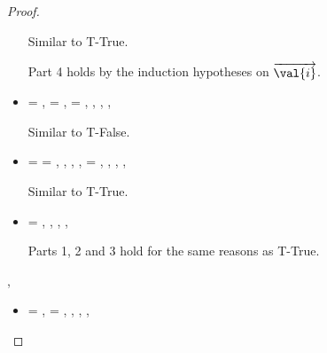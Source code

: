 \begin{lemma}
\begin{proof}
\begin{case}[B-Val]
\begin{itemize}
\begin{subcase}[T-Instance]
        Similar to T-True.

        Part 4 holds by the induction hypotheses on ${\overrightarrow{\val{i}}}$.
      \end{subcase}
  \item[] 
    \begin{subcase}[T-Nil] 
      \val{} = \nil{},
\ep{} = \nil, 
\e{} = \nil, 
\issubtypein{}{\Nil}{\ty{}},
\inpropenv{\botprop{}}{\thenprop{\prop{}}},
\inpropenv{\topprop{}}{\elseprop{\prop{}}},
\issubtypein{}{\emptyobject{}}{\object{}}

      Similar to T-False.
\end{subcase}
\item[]
\begin{subcase}[T-Multi] 
  \val{} = { {}}
  \ep{} = { {}},
  \judgementtworewrite {} {} {}{},
  ,
  ,
  \e{} = { {}},
  ,
  \inpropenv{\topprop{}}{\thenprop{\prop{}}},
  \inpropenv{\botprop{}}{\elseprop{\prop{}}},
  \issubtypein{}{\emptyobject{}}{\object{}}

        Similar to T-True.
\end{subcase}
\item[]
\begin{subcase}[T-Const]
  \e{} = {\const{}},
  \issubtypein{}{\constanttype{\const{}}}{\ty{}},
  \inpropenv{\topprop{}}{\thenprop{\prop{}}},
  \inpropenv{\botprop{}}{\elseprop{\prop{}}},
  \issubobjin{}{\emptyobject{}}{\object{}}

        Parts 1, 2 and 3 hold for the same reasons as T-True. 
\end{subcase}


  \end{itemize}
\end{case}



\begin{case}[B-Local]
{ \inopenv {\openv{}} {\x{}} {\val{}} },
{ \opsem {\openv{}} {\x{}} {\val{}} }

\begin{itemize}
  \item[]
\begin{subcase}[T-Local]
  \ep{} = \x{}, 
  \e{} = \x{}, 
  \inpropenv{\notprop {\falsy{}} {\x{}}}{\thenprop{\prop{}}},
  \inpropenv{\isprop {\falsy{}} {\x{}}}{\elseprop{\prop{}}},
\issubtypein{}{\x{}}{\object{}},
\inpropenv{\propenv{}}{\isprop{\ty{}}{\x{}}}


\end{subcase}
\end{itemize}
\end{case}
\end{proof}
\end{lemma}
